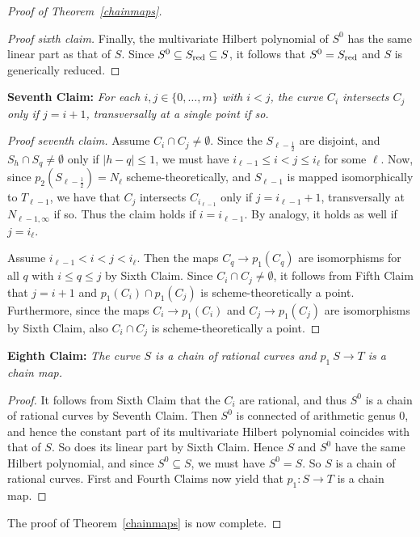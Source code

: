 \documentclass[10pt,a4paper]{amsart}
\def\red{\text{\rm red}}
\begin{document}
\begin{proof}[Proof of Theorem~\ref{chainmaps}]
\begin{proof}[Proof sixth claim]
Finally, the multivariate Hilbert polynomial of $S^0$ has the same linear part as that of $S$. Since $S^0\subseteq S_\red\subseteq S$, it follows that $S^0=S_\red$ and $S$ is generically reduced. 
\end{proof}

\vskip0.2cm

{\bf Seventh Claim:} {\it For each $i,j\in\{0,\dots,m\}$ with $i<j$, the curve $C_i$ intersects $C_j$ only if $j=i+1$, transversally at a single point if so.}

\begin{proof}[Proof seventh claim] Assume $C_i\cap C_j\neq\emptyset$. 
Since the $S_{\ell-\frac{1}{2}}$ are disjoint, and $S_h\cap S_q\neq\emptyset$ only if $|h-q|\leq 1$, we must have 
$i_{\ell-1}\leq i<j\leq i_{\ell}$ for some $\ell$. Now, since $p_2(S_{\ell-\frac{1}{2}})=N_\ell$ scheme-theoretically, and 
$S_{\ell-1}$ is mapped isomorphically to 
$T_{\ell-1}$, 
we have that $C_j$ intersects $C_{i_{\ell-1}}$ only if $j=i_{\ell-1}+1$, transversally at $N_{\ell-1,\infty}$ if so. Thus 
the claim holds if $i=i_{\ell-1}$. By analogy, it holds as well if $j=i_\ell$.

Assume $i_{\ell-1}<i<j<i_\ell$. Then the maps $C_q\to p_1(C_q)$ are isomorphisms for all $q$ with $i\leq q\leq j$ by Sixth Claim.
Since $C_i\cap C_j\neq\emptyset$, it follows from Fifth Claim that $j=i+1$ and $p_1(C_i)\cap p_1(C_j)$ is scheme-theoretically a point. Furthermore, since the maps $C_i\to p_1(C_i)$ and $C_j\to p_1(C_j)$ are isomorphisms by Sixth Claim, also $C_i\cap C_j$ is scheme-theoretically a point.
\end{proof}

{\bf Eighth Claim:} {\it The curve $S$ is a chain of rational curves and $p_1\:S\to T$ is a chain map.}

\begin{proof} It follows from Sixth Claim that the $C_i$ are rational, and thus $S^0$ is a chain of rational curves by Seventh Claim. Then $S^0$ is connected of arithmetic genus $0$, and hence the constant part of its multivariate Hilbert polynomial coincides with that of $S$. So does its linear part by Sixth Claim. Hence $S$ and $S^0$ have the same Hilbert polynomial, and since $S^0\subseteq S$, we must have $S^0=S$. So $S$ is a chain of rational curves. First and Fourth Claims now yield that $p_1\colon S\to T$ is a chain map.
\end{proof}

The proof of Theorem~\ref{chainmaps} is now complete.
\end{proof}
\end{document}
